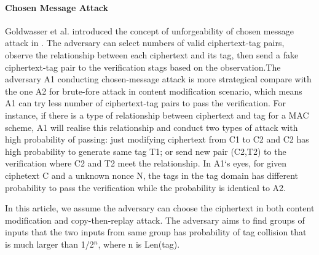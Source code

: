 \documentclass{article}
\begin{document}
\paragraph{Chosen Message Attack}
Goldwasser et al. introduced the concept of unforgeability of chosen message attack in \cite{}. The adversary can select numbers of valid ciphertext-tag pairs, observe the relationship between each ciphertext and its tag, then send a fake ciphertext-tag pair to the verification stags based on the observation.The adversary A1 conducting chosen-message attack is more strategical compare with the one A2 for brute-fore attack in content modification scenario, which means A1 can try less number of ciphertext-tag pairs to pass the verification. 
For instance, if there is a type of relationship between ciphertext and tag for a MAC scheme, A1 will realise this relationship and conduct two types of attack with high probability of passing: just modifying ciphertext from C1 to C2 and C2 has high probability to generate same tag T1; or send new pair (C2,T2) to the verification where C2 and T2 meet the relationship. In A1`s eyes, for given ciphetext C and a unknown nonce N, the tags in the tag domain has different probability to pass the verification while the probability is identical to A2. 

In this article, we assume the adversary can choose the ciphertext in both content modification and copy-then-replay attack. The adversary aims to find groups of inputs that the two inputs from same group has probability of tag collision that is much larger than 1/2$^n$, where n is Len(tag). 

\end{document}

